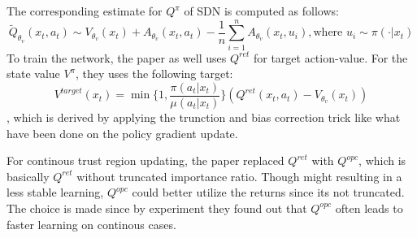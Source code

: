 The corresponding estimate for $Q^\pi$ of SDN is computed as follows:
\[
  \tilde{Q}_{\theta_v}(x_t, a_t) \sim V_{\theta_v}(x_t) + A_{\theta_v}(x_t, a_t) - \frac{1}{n}\sum_{i = 1}^n A_{\theta_v}(x_t, u_i), \text{where } u_i \sim \pi(\cdot | x_t)
\]
To train the network, the paper as well uses $Q^{ret}$ for target action-value.
For the state value $V^\pi$, they uses the following target:
\[
    V^{target}(x_t) = \min\{1, \frac{\pi(a_t|x_t)}{\mu(a_t | x_t)}\} (Q^{ret}(x_t, a_t) - V_{\theta_v}(x_t))
\]
, which is derived by applying the trunction and bias correction trick like what have been done on the policy gradient update.

For continous trust region updating, the paper replaced $Q^{ret}$ with $Q^{opc}$, 
which is basically $Q^{ret}$ without truncated importance ratio.
Though might resulting in a less stable learning, $Q^{opc}$ could better utilize the returns since its not truncated.
The choice is made since by experiment they found out that $Q^{opc}$ often leads to faster learning on continous cases.
